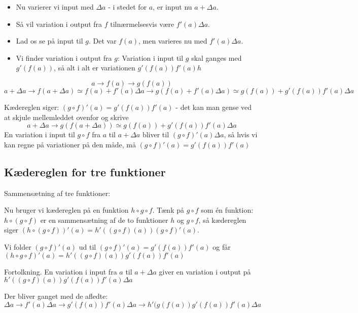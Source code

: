 \documentclass[a4paper, 12pt]{article}
\theoremstyle{remark}
\begin{document}
\begin{itemize}
\item Nu varierer vi input med  $\Delta a$ - i stedet for $a$, er input nu $a+\Delta a$. 
\item Så vil variation i output fra $f$ tilnærmelsesvis være   $f'(a)\Delta a$. 

\item Lad os se på input til $g$. Det var $f(a)$, men varieres nu med $f'(a)\Delta a$. 
\item Vi finder variation i output fra $g$: Variation i input til $g$ skal ganges med $g'(f(a))$, så alt i alt er variationen $g'(f(a))f'(a)h$
\end{itemize}


$$a\to f(a) \to g(f(a))$$  
$$a+\Delta a\to f(a+\Delta a)\simeq f(a)+f'(a)\Delta a\to  g(f(a)+f'(a)\Delta a)\simeq g(f(a))+g'(f(a))f'(a)\Delta a$$

Kædereglen siger:  $(g\circ f)'(a)=g'(f(a))f'(a)$ - det kan man gense ved at skjule mellemleddet ovenfor og skrive $$a+\Delta a\to g(f(a+\Delta a))\simeq g(f(a))+g'(f(a))f'(a)\Delta a$$ En variation i input til $g\circ f$ fra $a$ til $a+\Delta a$ bliver til $(g\circ f)'(a)\Delta a$, så hvis vi kan regne på variationer på den måde, må $(g\circ f)'(a)=g'(f(a))f'(a)$

\subsection*{Kædereglen for tre funktioner} Sammensætning af tre funktioner: 

Nu bruger vi kædereglen på en funktion $h\circ g\circ f$. Tænk på $g\circ f$ som \'en funktion: $h\circ (g\circ f)$ er en sammensætning af de to funktioner $h$ og  $g\circ f$, så kædereglen siger $(h\circ (g\circ f))'(a)=h'((g\circ f)(a))(g\circ f)'(a)$. 

Vi folder $(g\circ f)'(a)$ ud til $(g\circ f)'(a)=g'(f(a))f'(a)$ og får  $(h\circ g\circ f)'(a)=h'((g\circ f)(a))g'(f(a))f'(a)$ 

 Fortolkning. En variation i input fra $a$ til $a+\Delta a$ giver en variation i output på $h'((g\circ f)(a))g'(f(a))f'(a)\Delta a$ 


Der bliver ganget med de afledte: $$\Delta a\to f'(a)\Delta a\to g'(f(a))f'(a)\Delta a \to h'(g(f(a))g'(f(a))f'(a)\Delta a$$
\end{document}
